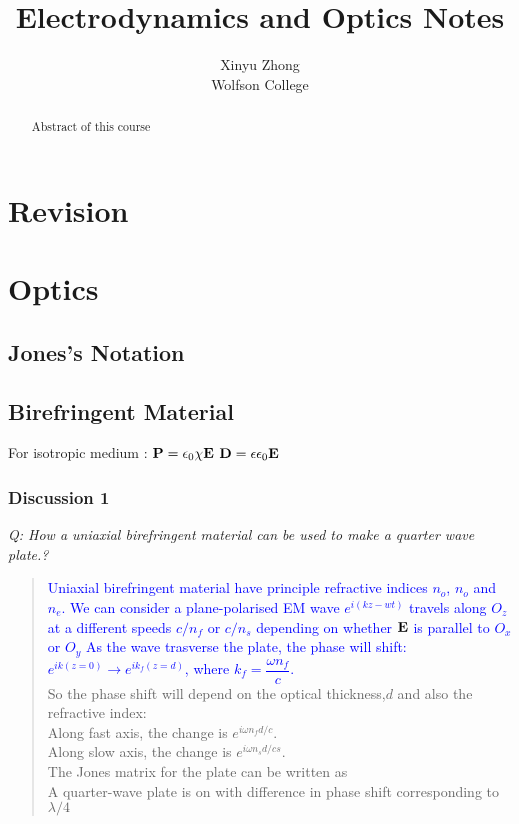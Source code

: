 \documentclass[12pt,a4paper]{article}
\author{Xinyu Zhong\\Wolfson College}
\title{Electrodynamics and Optics Notes}
\begin{document}
\begin{titlepage}
    \maketitle
\end{titlepage}

\tableofcontents

\newpage

\begin{abstract}
\noindent
Abstract of this course
\end{abstract}

\section{Revision}
\section{Optics}
    \subsection{Jones's Notation}
    \subsection{Birefringent Material}
        For isotropic medium :
        $\vb{P}=\epsilon_0\chi\vb{E}$
        $\vb{D} =\epsilon\epsilon_0\vb{E}$
        
        \subsubsection{Discussion 1}
            \textit{Q: How a uniaxial birefringent material can be used to make a quarter wave plate.?}\\
            \begin{quote}
            \textcolor{blue}{
            Uniaxial birefringent material have principle refractive indices $n_o$, $n_o$ and $n_e$. 
            We can consider a plane-polarised EM wave $e^{i(kz-wt)}$ travels along $O_z$
            at a different speeds $c/n_f$ or $c/n_s$ depending on whether $\vb{E}$ is parallel to $O_x$ or $O_y$
            As the wave trasverse the plate, the phase will shift: $e^{ik(z=0)}\rightarrow e^{ik_f(z=d)}$,
            where $k_f=\dfrac{\omega n_f}{c}$.\\}
            So the phase shift will depend on the optical thickness,$d$ and also the refractive index:\\
            Along fast axis, the change is $e^{i\omega n_f d/c}$.\\
            Along slow axis, the change is $e^{i\omega n_s d/cs}$.\\
            The Jones matrix for the plate can be written as\\
            A quarter-wave plate is on with difference in phase shift corresponding to $\lambda /4 $\\
            \end {quote}
\end{document}
